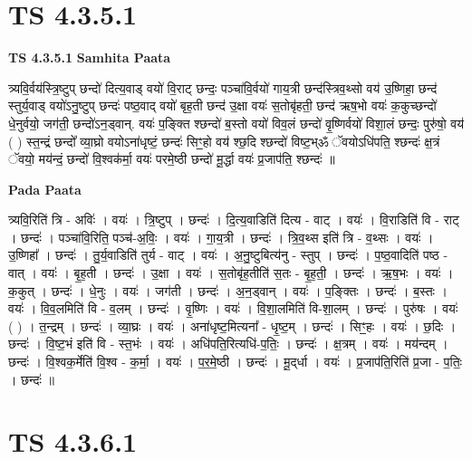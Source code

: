 \documentclass[17pt]{extarticle}
\begin{document}

\section{ TS 4.3.5.1 }

\textbf{TS 4.3.5.1 } \newline
\textbf{Samhita Paata} \newline

त्र्यवि॒र्वय॑स्त्रि॒ष्टुप् छन्दो॑ दित्य॒वाड् वयो॑ वि॒राट् छन्दः॒ पञ्चा॑वि॒र्वयो॑ गाय॒त्री छन्द॑स्त्रिव॒थ्सो वय॑ उ॒ष्णिहा॒ छन्द॑ स्तुर्य॒वाड् वयो॑ऽनु॒ष्टुप् छन्दः॑ पष्ठ॒वाद् वयो॑ बृह॒ती छन्द॑ उ॒क्षा वयः॑ स॒तोबृ॑हती॒ छन्द॑ ऋष॒भो वयः॑ क॒कुच्छन्दो॑ धे॒नुर्वयो॒ जग॑ती॒ छन्दो॑ऽन॒ड्वान्. वयः॑ प॒ङ्क्ति श्छन्दो॑ ब॒स्तो वयो॑ विव॒लं छन्दो॑ वृ॒ष्णिर्वयो॑ विशा॒लं छन्दः॒ पुरु॑षो॒ वय॑ ( ) स्त॒न्द्रं छन्दो᳚ व्या॒घ्रो वयोऽना॑धृष्टं॒ छन्दः॑ सिꣳ॒॒हो वय॑ श्छ॒दि श्छन्दो॑ विष्ट॒भ्ॐ ॅवयोऽधि॑पति॒ श्छन्दः॑ क्ष॒त्रं ॅवयो॒ मय॑न्दं॒ छन्दो॑ वि॒श्वक॑र्मा॒ वयः॑ परमे॒ष्ठी छन्दो॑ मू॒र्द्धा वयः॑ प्र॒जाप॑ति॒ श्छन्दः॑ ॥ \newline

\textbf{Pada Paata} \newline

त्र्यवि॒रिति॑ त्रि - अविः॑ । वयः॑ । त्रि॒ष्टुप् । छन्दः॑ । दि॒त्य॒वाडिति॑ दित्य - वाट् । वयः॑ । वि॒राडिति॑ वि - राट् । छन्दः॑ । पञ्चा॑वि॒रिति॒ पञ्च॑-अ॒विः॒ । वयः॑ । गा॒य॒त्री । छन्दः॑ । त्रि॒व॒थ्स इति॑ त्रि - व॒थ्सः । वयः॑ । उ॒ष्णिहा᳚ । छन्दः॑ । तु॒र्य॒वाडिति॑ तुर्य - वाट् । वयः॑ । अ॒नु॒ष्टुबित्य॑नु - स्तुप् । छन्दः॑ । प॒ष्ठ॒वादिति॑ पष्ठ - वात् । वयः॑ । बृ॒ह॒ती । छन्दः॑ । उ॒क्षा । वयः॑ । स॒तोबृ॑ह॒तीति॑ स॒तः - बृ॒ह॒ती॒ । छन्दः॑ । ऋ॒ष॒भः । वयः॑ । क॒कुत् । छन्दः॑ । धे॒नुः । वयः॑ । जग॑ती । छन्दः॑ । अ॒न॒ड्वान् । वयः॑ । प॒ङ्क्तिः । छन्दः॑ । ब॒स्तः । वयः॑ । वि॒व॒लमिति॑ वि - व॒लम् । छन्दः॑ । वृ॒ष्णिः । वयः॑ । वि॒शा॒लमिति॑ वि-शा॒लम् । छन्दः॑ । पुरु॑षः । वयः॑ ( ) । त॒न्द्रम् । छन्दः॑ । व्या॒घ्रः । वयः॑ । अना॑धृष्ट॒मित्यना᳚ - धृ॒ष्ट॒म् । छन्दः॑ । सिꣳ॒॒हः । वयः॑ । छ॒दिः । छन्दः॑ । वि॒ष्ट॒भं इति॑ वि - स्त॒भंः । वयः॑ । अधि॑पति॒रित्यधि॑-प॒तिः॒ । छन्दः॑ । क्ष॒त्रम् । वयः॑ । मय॑न्दम् । छन्दः॑ । वि॒श्वक॒र्मेति॑ वि॒श्व - क॒र्मा॒ । वयः॑ । प॒र॒मे॒ष्ठी । छन्दः॑ । मू॒द्‌र्धा । वयः॑ । प्र॒जाप॑ति॒रिति॑ प्र॒जा - प॒तिः॒ । छन्दः॑ ॥  \newline





\section{ TS 4.3.6.1 }
\end{document}
